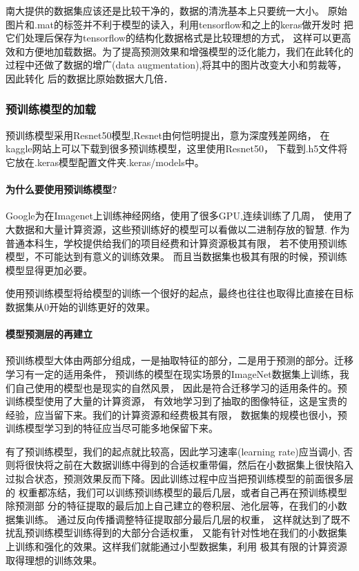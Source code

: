 南大提供的数据集应该还是比较干净的，数据的清洗基本上只要统一大小。
原始图片和.mat的标签并不利于模型的读入，利用tensorflow和之上的keras做开发时
把它们处理后保存为tensorflow的结构化数据格式是比较理想的方式，
这样可以更高效和方便地加载数据。为了提高预测效果和增强模型的泛化能力，我们在此转化的
过程中还做了数据的增广(data augmentation),将其中的图片改变大小和剪裁等，因此转化
后的数据比原始数据大几倍．

\subsubsection{预训练模型的加载}

预训练模型采用Resnet50模型,Resnet由何恺明提出，意为深度残差网络，
在kaggle网站上可以下载到很多预训练模型，这里使用Resnet50，
下载到.h5文件将它放在.keras模型配置文件夹.keras/models中。

\paragraph{为什么要使用预训练模型?}

Google为在Imagenet上训练神经网络，使用了很多GPU,连续训练了几周，
使用了大数据和大量计算资源，这些预训练好的模型可以看做以二进制存放的智慧.
作为普通本科生，学校提供给我们的项目经费和计算资源极其有限，
若不使用预训练模型，不可能达到有意义的训练效果。
而且当数据集也极其有限的时候，预训练模型显得更加必要。

使用预训练模型将给模型的训练一个很好的起点，最终也往往也取得比直接在目标数据集从0开始的训练更好的效果。

\paragraph{模型预测层的再建立}

预训练模型大体由两部分组成，一是抽取特征的部分，二是用于预测的部分。迁移学习有一定的适用条件，
预训练的模型在现实场景的ImageNet数据集上训练，我们自己使用的模型也是现实的自然风景，
因此是符合迁移学习的适用条件的。预训练模型使用了大量的计算资源，
有效地学习到了抽取的图像特征，这是宝贵的经验，应当留下来。我们的计算资源和经费极其有限，
数据集的规模也很小，预训练模型学习到的特征应当尽可能多地保留下来。

有了预训练模型，我们的起点就比较高，因此学习速率(learning rate)应当调小,
否则将很快将之前在大数据训练中得到的合适权重带偏，然后在小数据集上很快陷入
过拟合状态，预测效果反而下降。因此训练过程中应当把预训练模型的前面很多层的
权重都冻结，我们可以训练预训练模型的最后几层，或者自己再在预训练模型除预测部
分的特征提取的最后加上自己建立的卷积层、池化层等，在我们的小数据集训练。
通过反向传播调整特征提取部分最后几层的权重，
这样就达到了既不扰乱预训练模型训练得到的大部分合适权重，
又能有针对性地在我们的小数据集上训练和强化的效果。这样我们就能通过小型数据集，利用
极其有限的计算资源取得理想的训练效果。

